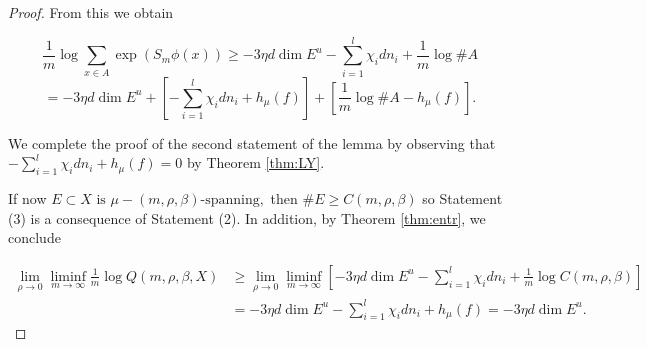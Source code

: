 \documentclass[10pt,a4paper]{amsart}
\begin{document}
\begin{proof}
From this we obtain

$$   \frac{1}{m} \log   \sum_{x\in A} \exp( S_m\phi (x))    \geq    - 3 \eta  d   \dim E^u      - \sum_{i=1}^l  \chi_i    d n_i    +   \frac{1}{m} \log \# A$$
$$ =    - 3 \eta  d   \dim E^u    + \left[  - \sum_{i=1}^l  \chi_i    d n_i  + h_{\mu}(f)\right]   +  \left[ \frac{1}{m} \log  \# A  - h_{\mu}(f)\right]. $$

We complete the proof of the second statement of the lemma by observing that $   - \sum_{i=1}^l  \chi_i    d n_i  + h_{\mu}(f) = 0$ by Theorem \ref{thm:LY}.

If now $    E\subset X \text{ is }  \mu-(m,\rho,\beta)  \text{-spanning},$ then $\# E\geq   C(m,\rho,\beta) $ so Statement (3) is a consequence of Statement (2).
In addition, by Theorem \ref{thm:entr}, we conclude


\begin{align*}
 \lim_{\rho \to 0} \liminf_{m\to \infty}   \frac{1}{m} \log   Q(m,\rho,\beta, X)    &   \geq   \lim_{\rho\to 0}  \liminf_{m\to\infty}  \left[   - 3 \eta  d   \dim E^u- \sum_{i=1}^l  \chi_i    d n_i    +   \frac{1}{m} \log  C(m,\rho,\beta) \right] \\
 & = - 3 \eta  d   \dim E^u     - \sum_{i=1}^l  \chi_i    d n_i  + h_{\mu}(f) =  - 3 \eta  d   \dim E^u.
\end{align*}




\end{proof}
\end{document}
